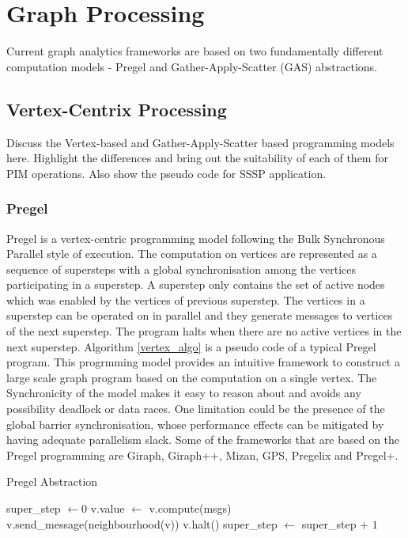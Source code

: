 \section{Graph Processing}


Current graph analytics frameworks are based on two fundamentally different computation models - Pregel and Gather-Apply-Scatter (GAS) abstractions. 

\subsection{Vertex-Centrix Processing}
Discuss the Vertex-based \cite{Pregel} and Gather-Apply-Scatter\cite{PowerGraph} based programming models here. Highlight the differences and bring out the suitability of each of them for PIM operations. Also show the pseudo code for SSSP application.

\subsubsection{Pregel}
Pregel is a vertex-centric programming model following the Bulk Synchronous Parallel style of execution. The computation on vertices are represented as a sequence of supersteps with a global synchronisation among the vertices participating in a superstep. A superstep only contains the set of active nodes which was enabled by the vertices of previous superstep. The vertices in a superstep can be operated on in parallel and they generate messages to vertices of the next superstep. The program halts when there are no active vertices in the next superstep. Algorithm \ref{vertex_algo} is a pseudo code of a typical Pregel program. This progrmming model provides an intuitive framework to construct a large scale graph program based on the computation on a single vertex. The Synchronicity of the model makes it easy to reason about and avoids any possibility deadlock or data races. One limitation could be the presence of the global barrier synchronisation, whose performance effects can be mitigated by having adequate parallelism slack. Some of the frameworks that are based on the Pregel programming are Giraph, Giraph++, Mizan, GPS, Pregelix and Pregel+.

\begin{algorithm}
\caption{Pregel Abstraction}
\label{vertex_algo}
\begin{algorithmic}[1]
  \State super\_step $\gets 0$
      \State v.value $\gets$ v.compute(msgs) 
      \State v.send\_message(neighbourhood(v))
      \State v.halt()
    \EndFor
  \EndWhile
  \State super\_step $\gets$ super\_step + $1$

\end{algorithmic}
\end{algorithm}

